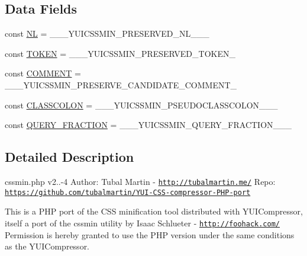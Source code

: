 \subsection*{Data Fields}
\begin{DoxyCompactItemize}
\item 
const \hyperlink{class_c_s_smin_a3948c042f5024ab0264a5413294eff6a}{NL} = \textquotesingle{}\+\_\+\+\_\+\+\_\+\+Y\+U\+I\+C\+S\+S\+M\+I\+N\+\_\+\+P\+R\+E\+S\+E\+R\+V\+E\+D\+\_\+\+N\+L\+\_\+\+\_\+\+\_\+\textquotesingle{}
\item 
const \hyperlink{class_c_s_smin_a532b722025b61ca3bb2155401be4b24e}{T\+O\+K\+EN} = \textquotesingle{}\+\_\+\+\_\+\+\_\+\+Y\+U\+I\+C\+S\+S\+M\+I\+N\+\_\+\+P\+R\+E\+S\+E\+R\+V\+E\+D\+\_\+\+T\+O\+K\+E\+N\+\_\+\textquotesingle{}
\item 
const \hyperlink{class_c_s_smin_a4951cfda1f15c6edbf240a5c44971eb0}{C\+O\+M\+M\+E\+NT} = \textquotesingle{}\+\_\+\+\_\+\+\_\+\+Y\+U\+I\+C\+S\+S\+M\+I\+N\+\_\+\+P\+R\+E\+S\+E\+R\+V\+E\+\_\+\+C\+A\+N\+D\+I\+D\+A\+T\+E\+\_\+\+C\+O\+M\+M\+E\+N\+T\+\_\+\textquotesingle{}
\item 
const \hyperlink{class_c_s_smin_a14a4187d5a8db7d78e7bdcde466c7a8c}{C\+L\+A\+S\+S\+C\+O\+L\+ON} = \textquotesingle{}\+\_\+\+\_\+\+\_\+\+Y\+U\+I\+C\+S\+S\+M\+I\+N\+\_\+\+P\+S\+E\+U\+D\+O\+C\+L\+A\+S\+S\+C\+O\+L\+O\+N\+\_\+\+\_\+\+\_\+\textquotesingle{}
\item 
const \hyperlink{class_c_s_smin_adb89044faa7ff89d1518705934a4c008}{Q\+U\+E\+R\+Y\+\_\+\+F\+R\+A\+C\+T\+I\+ON} = \textquotesingle{}\+\_\+\+\_\+\+\_\+\+Y\+U\+I\+C\+S\+S\+M\+I\+N\+\_\+\+Q\+U\+E\+R\+Y\+\_\+\+F\+R\+A\+C\+T\+I\+O\+N\+\_\+\+\_\+\+\_\+\textquotesingle{}
\end{DoxyCompactItemize}


\subsection{Detailed Description}
cssmin.\+php v2..-\/4 Author\+: Tubal Martin -\/ \href{http://tubalmartin.me/}{\tt http\+://tubalmartin.\+me/} Repo\+: \href{https://github.com/tubalmartin/YUI-CSS-compressor-PHP-port}{\tt https\+://github.\+com/tubalmartin/\+Y\+U\+I-\/\+C\+S\+S-\/compressor-\/\+P\+H\+P-\/port}

This is a P\+HP port of the C\+SS minification tool distributed with Y\+U\+I\+Compressor, itself a port of the cssmin utility by Isaac Schlueter -\/ \href{http://foohack.com/}{\tt http\+://foohack.\+com/} Permission is hereby granted to use the P\+HP version under the same conditions as the Y\+U\+I\+Compressor.

